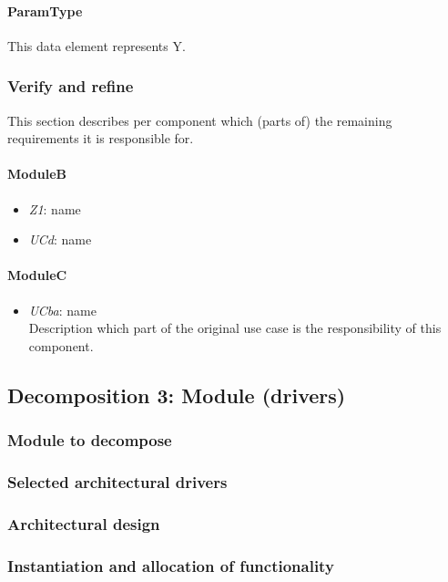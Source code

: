 \documentclass[a4paper,10pt]{article}
\begin{document}
\paragraph{ParamType} This data element represents Y.

\subsubsection{Verify and refine}
This section describes per component which (parts of) the remaining
requirements it is responsible for.

\paragraph{ModuleB}
\begin{itemize}
    \item \emph{Z1}: name
    \item \emph{UCd}: name
\end{itemize}

\paragraph{ModuleC}
\begin{itemize}
    \item \emph{UCba}: name\\Description which part of the original use case is
        the responsibility of this component.
\end{itemize}

\subsection{Decomposition 3: Module (drivers)}
\subsubsection{Module to decompose}
\subsubsection{Selected architectural drivers}
\subsubsection{Architectural design}
\subsubsection{Instantiation and allocation of functionality}
\end{document}
